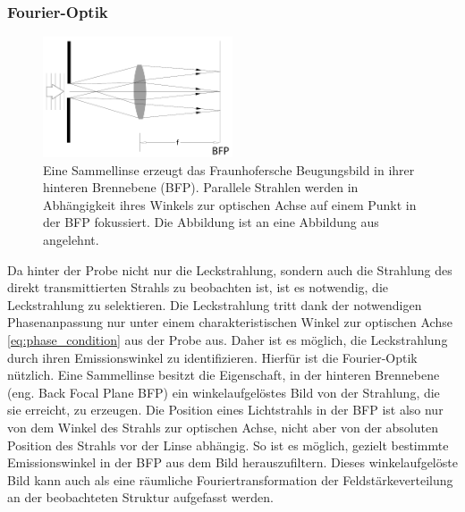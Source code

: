 \documentclass[titlepage,  ngerman]{article}
\begin{document}
	\subsubsection{Fourier-Optik}
	\label{sec:fourier}
	\begin{figure}[h] 
		\centering
		\includegraphics[width=0.5\textwidth]{figures/FourierLinse.pdf}
		\caption[Fourieroptik]{Eine Sammellinse erzeugt das Fraunhofersche Beugungsbild in ihrer hinteren Brennebene (BFP). Parallele Strahlen werden in Abhängigkeit ihres Winkels zur optischen Achse auf einem Punkt in der BFP fokussiert. Die Abbildung ist an eine Abbildung aus \cite{Hecht.2018} angelehnt.}
		\label{fig:FourierLinse}
	\end{figure}
	Da hinter der Probe nicht nur die Leckstrahlung, sondern auch die Strahlung des direkt transmittierten Strahls zu beobachten ist, ist es notwendig, die Leckstrahlung zu selektieren. Die Leckstrahlung tritt dank der notwendigen Phasenanpassung nur unter einem charakteristischen Winkel zur optischen Achse \eqref{eq:phase_condition} aus der Probe aus. Daher ist es möglich, die Leckstrahlung durch ihren Emissionswinkel zu identifizieren. Hierfür ist die Fourier-Optik nützlich. Eine Sammellinse besitzt die Eigenschaft, in  der hinteren Brennebene (eng. Back Focal Plane BFP) ein winkelaufgelöstes Bild von der Strahlung, die sie erreicht, zu erzeugen\cite{Hecht.1996}. Die Position eines Lichtstrahls in der BFP ist also nur von dem Winkel des Strahls zur optischen Achse, nicht aber von der absoluten Position des Strahls vor der Linse abhängig. So ist es möglich, gezielt bestimmte Emissionswinkel in der BFP aus dem Bild herauszufiltern. Dieses winkelaufgelöste Bild kann auch als eine räumliche Fouriertransformation der Feldstärkeverteilung an der beobachteten Struktur aufgefasst werden. 
	
\end{document}
